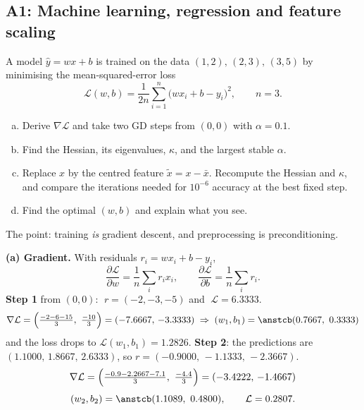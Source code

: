 \subsection{A1: Machine learning, regression and feature scaling}

\begin{frame}{}
  \begin{probbox}
    A model $\hat y = wx + b$ is trained on the data $(1,2),\,(2,3),\,(3,5)$ by minimising the
    mean-squared-error loss
    \[
      \mathcal L(w,b) = \frac{1}{2n}\sum_{i=1}^{n}\bigl(wx_i + b - y_i\bigr)^2, \qquad n = 3 .
    \]
    \vspace{-8pt}
    \begin{enumerate}[(a)]
      \item Derive $\nabla\mathcal L$ and take two GD steps from $(0,0)$ with $\alpha = 0.1$.
      \item Find the Hessian, its eigenvalues, $\kappa$, and the largest stable $\alpha$.
      \item Replace $x$ by the centred feature $\tilde x = x - \bar x$. Recompute the Hessian and $\kappa$, and
            compare the iterations needed for $10^{-6}$ accuracy at the best fixed step.
      \item Find the optimal $(w,b)$ and explain what you see.
    \end{enumerate}
  \end{probbox}
  \footnotesize\textcolor{mGrey}{The point: training \emph{is} gradient descent, and preprocessing is preconditioning.}
\end{frame}

\begin{frame}{}
  \textbf{(a) Gradient.} With residuals $r_i = wx_i + b - y_i$,
  \[
    \frac{\partial\mathcal L}{\partial w} = \frac1n\sum_i r_i x_i, \qquad
    \frac{\partial\mathcal L}{\partial b} = \frac1n\sum_i r_i .
  \]
  \textbf{Step 1} from $(0,0)$: $\;r = (-2,-3,-5)$ and $\;\mathcal L = 6.3333$.
  \[
    \nabla\mathcal L = \Bigl(\tfrac{-2-6-15}{3},\ \tfrac{-10}{3}\Bigr) = (-7.6667,\,-3.3333)
    \;\Rightarrow\; (w_1,b_1) = \ans{(0.7667,\ 0.3333)}
  \]
  and the loss drops to $\mathcal L(w_1,b_1) = 1.2826$.
  \textbf{Step 2}: the predictions are $(1.1000,\,1.8667,\,2.6333)$, so $r = (-0.9000,\,-1.1333,\,-2.3667)$.
  \[
    \nabla\mathcal L = \Bigl(\tfrac{-0.9-2.2667-7.1}{3},\ \tfrac{-4.4}{3}\Bigr) = (-3.4222,\,-1.4667)
  \]
  \[
    (w_2,b_2) = \ans{(1.1089,\ 0.4800)}, \qquad \mathcal L = 0.2807 .
  \]
\end{frame}

